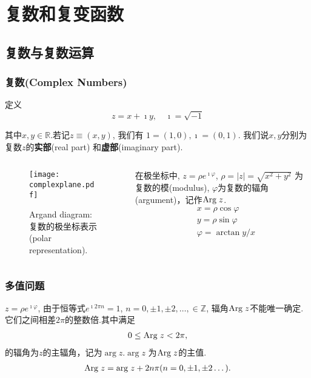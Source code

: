 \section{复数和复变函数}

\subsection{复数与复数运算}

\begin{frame}
\frametitle{复数(Complex Numbers)}

\begin{block}{定义}
    \begin{equation*}
        z = x + \imath y, \quad \imath = \sqrt{-1}
    \end{equation*} 
\end{block}
其中$x,y \in {\mathbb{R}}$.若记$z \equiv (x,y)$, 我们有
$1 = (1,0), \imath = (0, 1)$.
我们说$x,y$分别为复数$z$的{\bf 实部}(real part) 和{\bf 虚部}(imaginary part).
\begin{columns}
\begin{column}{0.6\textwidth}
    \begin{figure}
        \texttt{[image: complexplane.pdf]}
        \caption{Argand diagram:复数的极坐标表示(polar representation).}
    \end{figure}
\end{column}
\begin{column}{0.4\textwidth}   
     在极坐标中, $z=\rho e^{\imath \varphi}$, $\rho = |z|=\sqrt{x^2 + y^2}$ 为复数的模(modulus), $\varphi$为复数的辐角(argument)，记作${\mathrm{Arg}\;} z$.
    \begin{align*}
        & x = \rho \cos\varphi \\
        & y = \rho \sin\varphi \\
        & \varphi = \arctan y/x
    \end{align*}
\end{column}
\end{columns}
\end{frame}


\begin{frame}
    \frametitle{多值问题}
$z=\rho e^{\imath \varphi}$, 由于恒等式$e^{\imath 2\pi n} = 1$, $n = 0, \pm 1, \pm 2, \dots, \in \mathbb{Z}$, 辐角${\mathrm{Arg}\;} z$不能唯一确定.
它们之间相差$2\pi$的整数倍.其中满足
\begin{align*}
    0 \leq {\mathrm{Arg}\;} z < 2\pi,
\end{align*}
的辐角为$z$的主辐角，记为$\arg z$.$\arg z$ 为${\mathrm{Arg}\;} z$的主值.
\begin{align*}
    {\mathrm{Arg}\;} z = {\mathrm{arg}\;} z + 2 n \pi (n = 0, \pm 1, \pm 2\dots).
\end{align*}

\end{frame}


